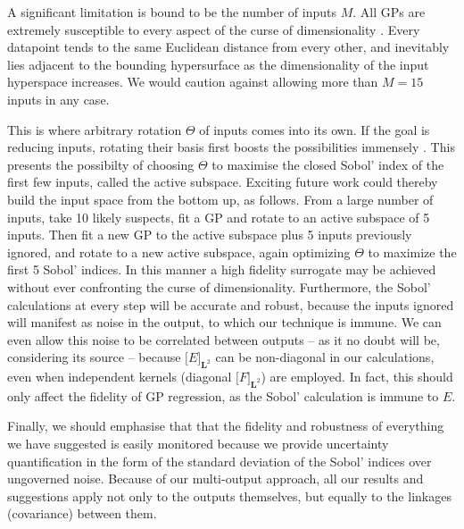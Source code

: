 \documentclass[preprint,12pt]{elsarticle}
\newcommand*{\mi}[1]{\mathbf{#1}}
\newcommand*{\tte}[2][]{\lbrack{#2}\rbrack_{#1}}
\begin{document}
    A significant limitation is bound to be the number of inputs $M$. All GPs are extremely susceptible to every aspect of the curse of dimensionality \cite{Bellman1966,Binois2021}. Every datapoint tends to the same Euclidean distance from every other, and inevitably lies adjacent to the bounding hypersurface as the dimensionality of the input hyperspace increases. We would caution against allowing more than $M=15$ inputs in any case.

    This is where arbitrary rotation $\Theta$ of inputs comes into its own. If the goal is reducing inputs, rotating their basis first boosts the possibilities immensely \cite{Constantine2015}. This presents the possibilty of choosing $\Theta$ to maximise the closed Sobol' index of the first few inputs, called the active subspace.
    Exciting future work could thereby build the input space from the bottom up, as follows. From a large number of inputs, take 10 likely suspects, fit a GP and rotate to an active subspace of 5 inputs. Then fit a new GP to the active subspace plus 5 inputs previously ignored, and rotate to a new active subspace, again optimizing $\Theta$ to maximize the first 5 Sobol' indices. In this manner a high fidelity surrogate may be achieved without ever confronting the curse of dimensionality. Furthermore, the Sobol' calculations at every step will be accurate and robust, because the inputs ignored will manifest as noise in the output, to which our technique is immune. We can even allow this noise to be correlated between outputs -- as it no doubt will be, considering its source -- because $\tte[\mi{L}^{2}]{E}$ can be non-diagonal in our calculations, even when independent kernels (diagonal $\tte[\mi{L}^{2}]{F}$) are employed. In fact, this should only affect the fidelity of GP regression, as the Sobol' calculation is immune to $E$.

    Finally, we should emphasise that that the fidelity and robustness of everything we have suggested is easily monitored because we provide uncertainty quantification in the form of the standard deviation of the Sobol' indices over ungoverned noise. Because of our multi-output approach, all our results and suggestions apply not only to the outputs themselves, but equally to the linkages (covariance) between them.



 

\end{document}
